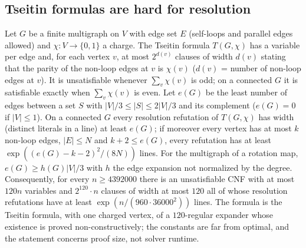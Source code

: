 \begin{result}
\subsection{Tseitin formulas are hard for resolution}
Let $G$ be a finite multigraph on $V$ with edge set $E$ (self-loops and parallel
edges allowed) and $\chi:V\to\{0,1\}$ a charge. The Tseitin formula $T(G,\chi)$
has a variable per edge and, for each vertex $v$, at most $2^{d(v)}$ clauses of
width $d(v)$ stating that the parity of the non-loop edges at $v$ is $\chi(v)$
($d(v)$ = number of non-loop edges at $v$). It is unsatisfiable whenever
$\sum_v\chi(v)$ is odd; on a connected $G$ it is satisfiable exactly when
$\sum_v\chi(v)$ is even. Let $e(G)$ be the least number of edges between a set
$S$ with $|V|/3\le|S|\le2|V|/3$ and its complement ($e(G)=0$ if $|V|\le1$). On a
connected $G$ every resolution refutation of $T(G,\chi)$ has width (distinct literals in
a line) at least $e(G)$; if moreover every vertex has at most $k$ non-loop edges,
$|E|\le N$ and $k+2\le e(G)$, every refutation has at least $\exp((e(G)-k-2)^2/(8N))$
lines. For the multigraph of a rotation map, $e(G)\ge h(G)|V|/3$ with $h$ the edge
expansion not normalized by the degree. Consequently, for every $n\ge 4392000$ there is an
unsatisfiable CNF with at most $120n$ variables and $2^{120}\cdot n$ clauses of width at most
$120$ all of whose resolution refutations have at least $\exp(n/(960\cdot36000^2))$ lines.
The formula is the Tseitin formula, with one charged vertex, of a $120$-regular expander
whose existence is proved non-constructively; the constants are far from optimal, and the
statement concerns proof size, not solver runtime.
\citep{Tseitin1983,Urquhart1987,BenSassonWigderson2001,Jukna2012}
\end{result}

